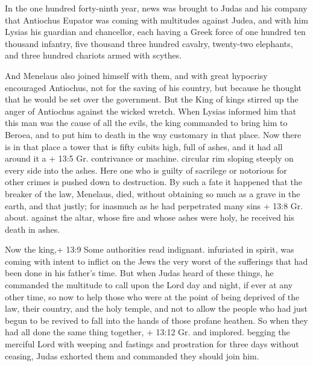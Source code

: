  In the one hundred forty-ninth year, news was brought to
Judas and his company that Antiochus Eupator was coming with multitudes
against Judea,  and with him Lysias his guardian and
chancellor, each having a Greek force of one hundred ten thousand
infantry, five thousand three hundred cavalry, twenty-two elephants, and
three hundred chariots armed with scythes.

 And Menelaus also joined himself with them, and with great
hypocrisy encouraged Antiochus, not for the saving of his country, but
because he thought that he would be set over the government.
 But the King of kings stirred up the anger of Antiochus
against the wicked wretch. When Lysias informed him that this man was
the cause of all the evils, the king commanded to bring him to Beroea,
and to put him to death in the way customary in that place. 
Now there is in that place a tower that is fifty cubits high, full of
ashes, and it had all around it a + 13:5 Gr. contrivance or machine.
circular rim sloping steeply on every side into the ashes. 
Here one who is guilty of sacrilege or notorious for other crimes is
pushed down to destruction.  By such a fate it happened that
the breaker of the law, Menelaus, died, without obtaining so much as a
grave in the earth, and that justly;  for inasmuch as he had
perpetrated many sins + 13:8 Gr. about. against the altar, whose fire
and whose ashes were holy, he received his death in ashes.

 Now the king,+ 13:9 Some authorities read indignant.
infuriated in spirit, was coming with intent to inflict on the Jews the
very worst of the sufferings that had been done in his father's time.
 But when Judas heard of these things, he commanded the
multitude to call upon the Lord day and night, if ever at any other
time, so now to help those who were at the point of being deprived of
the law, their country, and the holy temple,  and not to
allow the people who had just begun to be revived to fall into the hands
of those profane heathen.  So when they had all done the
same thing together, + 13:12 Gr. and implored. begging the merciful Lord
with weeping and fastings and prostration for three days without
ceasing, Judas exhorted them and commanded they should join him.

